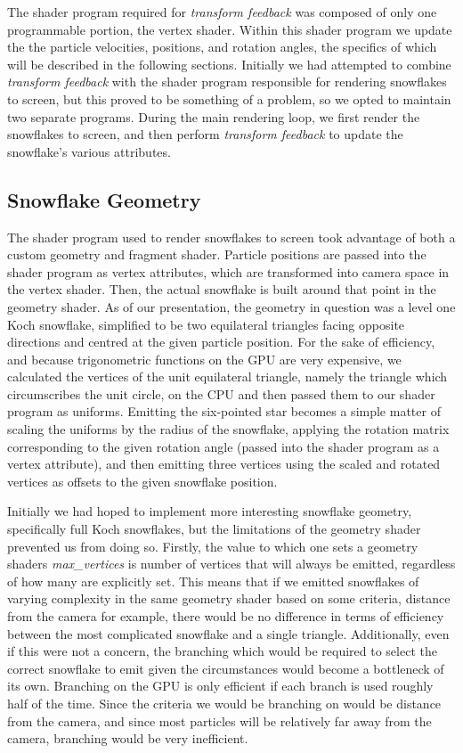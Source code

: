 \documentclass[conference]{acmsiggraph}
\begin{document}
The shader program required for \textit{transform feedback} was composed of only one programmable portion, the vertex shader. Within this shader program we update the the particle velocities, positions, and rotation angles, the specifics of which will be described in the following sections. Initially we had attempted to combine \textit{transform feedback} with the shader program responsible for rendering snowflakes to screen, but this proved to be something of a problem, so we opted to maintain two separate programs. During the main rendering loop, we first render the snowflakes to screen, and then perform \textit{transform feedback} to update the snowflake's various attributes.

\subsection{Snowflake Geometry}
The shader program used to render snowflakes to screen took advantage of both a custom geometry and fragment shader. Particle positions are passed into the shader program as vertex attributes, which are transformed into camera space in the vertex shader. Then, the actual snowflake is built around that point in the geometry shader. As of our presentation, the geometry in question was a level one Koch snowflake, simplified to be two equilateral triangles facing opposite directions and centred at the given particle position. For the sake of efficiency, and because trigonometric functions on the GPU are very expensive, we calculated the vertices of the unit equilateral triangle, namely the triangle which circumscribes the unit circle, on the CPU and then passed them to our shader program as uniforms. Emitting the six-pointed star becomes a simple matter of scaling the uniforms by the radius of the snowflake, applying the rotation matrix corresponding to the given rotation angle (passed into the shader program as a vertex attribute), and then emitting three vertices using the scaled and rotated vertices as offsets to the given snowflake position.

Initially we had hoped to implement more interesting snowflake geometry, specifically full Koch snowflakes, but the limitations of the geometry shader prevented us from doing so. Firstly, the value to which one sets a geometry shaders \textit{max\_vertices} is number of vertices that will always be emitted, regardless of how many are explicitly set. This means that if we emitted snowflakes of varying complexity in the same geometry shader based on some criteria, distance from the camera for example, there would be no difference in terms of efficiency between the most complicated snowflake and a single triangle. Additionally, even if this were not a concern, the branching which would be required to select the correct snowflake to emit given the circumstances would become a bottleneck of its own. Branching on the GPU is only efficient if each branch is used roughly half of the time. Since the criteria we would be branching on would be distance from the camera, and since most particles will be relatively far away from the camera, branching would be very inefficient.
\end{document}
